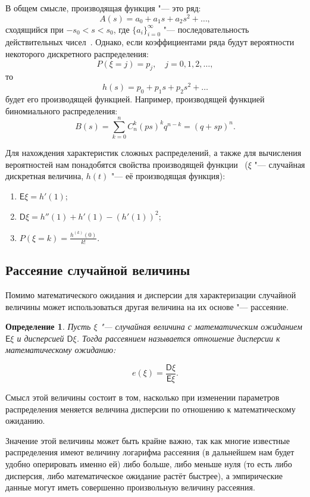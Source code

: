 \documentclass[12pt, specialist, subf, substylefile = spbu.rtx]{disser}
\newtheorem{define}{Определение}
\begin{document}
	В общем смысле, производящая функция "--- это ряд:
	\[
		A(s) = a _0 + a _1 s + a _2 s ^2 + \dots,
	\]
	сходящийся при $ -s _0 < s < s _0 $, где $ \{ a _i \} ^{\infty} _{i = 0} $ "--- последовательность действительных чисел~\cite{bib:feller1952}. Однако, если коэффициентами ряда будут вероятности некоторого дискретного распределения:
	\[
		P(\xi = j) = p _j, \quad j = 0, 1, 2, \dots,
	\]
	то
	\[
		h(s) = p _0 + p _1 s + p _2 s ^2 + \dots
	\]
	будет его производящей функцией. Например, производящей функцией биномиального распределения:
	\[
		B(s) = \sum \limits ^n _{k = 0} C ^k _n (ps) ^k q ^{n - k} = (q + sp) ^n.
	\]
	
	Для нахождения характеристик сложных распределений, а также для вычисления вероятностей нам понадобятся свойства производящей функции~\cite{bib:feller1952} ($ \xi $ "--- случайная дискретная величина, $ h(t) $ "--- её производящая функция):
	
	\begin{enumerate}
		\item $ \mathsf{E} \xi = h' (1) $;
		
		\item $ \mathsf{D} \xi = h''(1) + h'(1) - \left( h' (1) \right) ^2 $;
		
		\item $ P(\xi = k) = \frac{h^{(k)}(0)} {k!} $.
	\end{enumerate}

	\subsection{Рассеяние случайной величины}
	
	Помимо математического ожидания и дисперсии для характеризации случайной величины может использоваться другая величина на их основе "--- рассеяние.
	
	\begin{define}
		Пусть $ \xi $ "--- случайная величина с математическим ожиданием $ \mathsf{E} \xi $ и дисперсией $ \mathsf{D} \xi $. Тогда рассеянием называется отношение дисперсии к математическому ожиданию:
		
		\[
			e (\xi) = \frac {\mathsf{D} \xi} {\mathsf{E} \xi}.
		\]
		\label{def:scattering}
	\end{define}

	Смысл этой величины состоит в том, насколько при изменении параметров распределения меняется величина дисперсии по отношению к математическому ожиданию.
	
	Значение этой величины может быть крайне важно, так как многие известные распределения имеют величину логарифма рассеяния (в дальнейшем нам будет удобно оперировать именно ей) либо больше, либо меньше нуля (то есть либо дисперсия, либо математическое ожидание растёт быстрее), а эмпирические данные могут иметь совершенно произвольную величину рассеяния.
	
\end{document}
